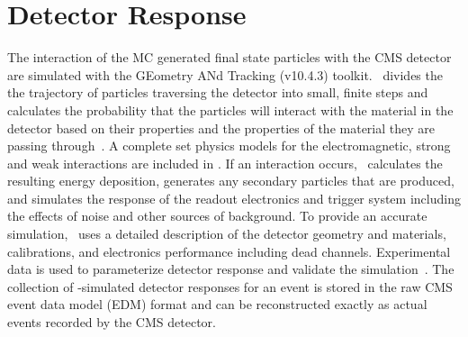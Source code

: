 \section{Detector Response}
The interaction of the MC generated final state particles with the CMS detector are simulated with the GEometry ANd Tracking (\Geant v10.4.3) toolkit.
\Geant\ divides the the trajectory of particles traversing the detector into small, finite steps and calculates the probability that the particles will interact with the material in the detector based on their properties and the properties of the material they are passing through~\cite{AGOSTINELLI2003250}.
A complete set physics models for the electromagnetic, strong and weak interactions are included in \Geant.
If an interaction occurs, \Geant\ calculates the resulting energy deposition, generates any secondary particles that are produced, and simulates the response of the readout electronics and trigger system including the effects of noise and other sources of background.
To provide an accurate simulation, \Geant\ uses a detailed description of the detector geometry and materials, calibrations, and electronics performance including dead channels.
Experimental data is used to parameterize detector response and validate the simulation~\cite{Bayatian:922757}.
The collection of \Geant-simulated detector responses for an event is stored in the raw CMS event data model (EDM) format and can be reconstructed exactly as actual events recorded by the CMS detector.